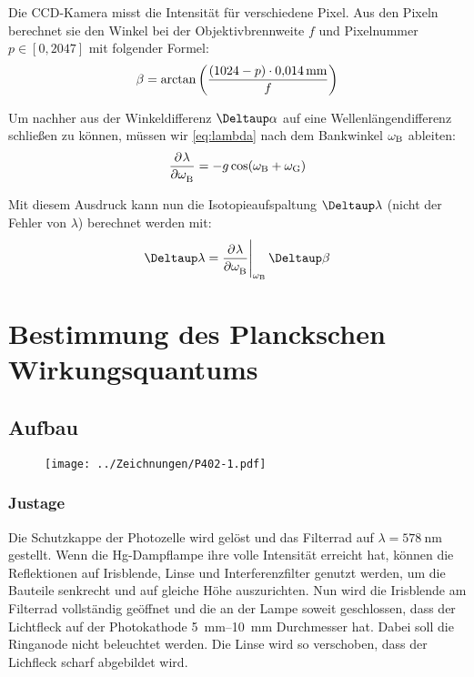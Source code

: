 Die CCD-Kamera misst die Intensität für verschiedene Pixel. Aus den Pixeln
berechnet sie den Winkel bei der Objektivbrennweite $f$ und Pixelnummer $p \in
[0, 2047]$ mit folgender Formel:
\[
    \beta = \arctan\del{\frac{(1024 - p) \cdot \SI{0.014}{\milli\meter}}f}
\]

Um nachher aus der Winkeldifferenz $\Deltaup \alpha$ auf eine
Wellenlängendifferenz schließen zu können, müssen wir \eqref{eq:lambda} nach
dem Bankwinkel $\omega_\text B$ ableiten:
\begin{equation}
    \label{eq:d_Lambda_d_beta}
    \dpd\lambda\omegaB = - g \cos(\omegaB + \omegaG)
\end{equation}

Mit diesem Ausdruck kann nun die Isotopieaufspaltung $\Deltaup \lambda$ (nicht
der Fehler von $\lambda$) berechnet werden mit:
\begin{equation}
    \label{eq:Delta_lambda}
    \Deltaup\lambda = \eval{\dpd\lambda\omegaB}_{\omegaB} \Deltaup\beta
\end{equation}


\FloatBarrier
\chapter{Bestimmung des Planckschen Wirkungsquantums}

\FloatBarrier
\section{Aufbau}

\begin{figure}[htbp]
    \centering
    \texttt{[image: ../Zeichnungen/P402-1.pdf]}
    \caption{%
        \parencite[Abbildung~P402.1]{physik412-Anleitung}
    }
    \label{fig:P402.1}
\end{figure}

\FloatBarrier
\subsection{Justage}

Die Schutzkappe der Photozelle wird gelöst und das Filterrad auf $\lambda =
\SI{578}{\nano\meter}$ gestellt. Wenn die Hg-Dampflampe ihre volle Intensität
erreicht hat, können die Reflektionen auf Irisblende, Linse und
Interferenzfilter genutzt werden, um die Bauteile senkrecht und auf gleiche
Höhe auszurichten. Nun wird die Irisblende am Filterrad vollständig geöffnet
und die an der Lampe soweit geschlossen, dass der Lichtfleck auf der
Photokathode \SIrange{5}{10}{\milli\meter} Durchmesser hat. Dabei soll die
Ringanode nicht beleuchtet werden. Die Linse wird so verschoben, dass der
Lichfleck scharf abgebildet wird.

